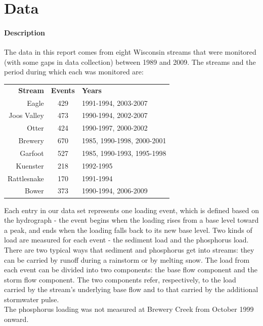 \documentclass[10pt]{article}
\begin{document}
\section{Data}
\paragraph{Description}
The data in this report comes from eight Wisconsin streams that were monitored (with some gaps in data collection) between 1989 and 2009. The streams and the period during which each was monitored are:

\begin{table}[h]
\begin{center}
\begin{tabular}{r c l}
        \textbf{Stream}  & \textbf{Events} & \textbf{Years}\\
        Eagle & 429 &1991-1994, 2003-2007\\
        Joos Valley & 473 & 1990-1994, 2002-2007\\
        Otter & 424 & 1990-1997, 2000-2002\\
        Brewery & 670 & 1985, 1990-1998, 2000-2001\\
        Garfoot & 527 & 1985, 1990-1993, 1995-1998\\
        Kuenster & 218 & 1992-1995\\
        Rattlesnake & 170 & 1991-1994\\
        Bower & 373 & 1990-1994, 2006-2009\\
    \end{tabular}
\end{center}
\end{table}

Each entry in our data set represents one loading event, which is defined based on the hydrograph - the event begins when the loading rises from a base level toward a peak, and ends when the loading falls back to its new base level. Two kinds of load are measured for each event - the sediment load and the phosphorus load. There are two typical ways that sediment and phosphorus get into streams: they can be carried by runoff during a rainstorm or by melting snow. The load from each event can be divided into two components: the base flow component and the storm flow component. The two components refer, respectively, to the load carried by the stream's underlying base flow and to that carried by the additional stormwater pulse.\\

The phosphorus loading was not measured at Brewery Creek from October 1999 onward.\\
\end{document}
